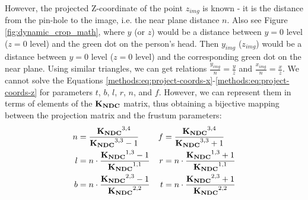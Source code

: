 However, the projected Z-coordinate of the point $z_{img}$ is known - it is the distance from the pin-hole to the image, i.e. the near plane distance $n$. Also see Figure \ref{fig:dynamic_crop_math}, where $y$ (or $z$) would be a distance between $y=0$ level ($z=0$ level) and the green dot on the person's head. Then $y_{img}$ ($z_{img}$) would be a distance between $y=0$ level ($z = 0$ level) and the corresponding green dot on the near plane. Using similar triangles, we can get relations $\tfrac{y_{img}}{n} = \tfrac{y}{z}$ and $\tfrac{x_{img}}{n} = \tfrac{x}{z}$. We cannot solve the Equations \ref{methods:eq:project-coords-x}-\ref{methods:eq:project-coords-z} for parameters $t$, $b$, $l$, $r$, $n$, and $f$. However, we can represent them in terms of elements of the $\bm{\mathrm{K_{NDC}}}$ matrix, thus obtaining a bijective mapping between the projection matrix and the frustum parameters:
\begin{align}
	n &= \dfrac{\bm{\mathrm{K_{NDC}}}^{3,4}}{\bm{\mathrm{K_{NDC}}}^{3,3} - 1} & f &= \dfrac{\bm{\mathrm{K_{NDC}}}^{3, 4}}{\bm{\mathrm{K_{NDC}}}^{3, 3} + 1} \\
	l &= n\cdot \dfrac{\bm{\mathrm{K_{NDC}}}^{1,3} - 1}{\bm{\mathrm{K_{NDC}}}^{1,1}} & r &= n\cdot \dfrac{\bm{\mathrm{K_{NDC}}}^{1,3} + 1}{\bm{\mathrm{K_{NDC}}}^{1,1}} \\
	b &= n\cdot \dfrac{\bm{\mathrm{K_{NDC}}}^{2,3} - 1}{\bm{\mathrm{K_{NDC}}}^{2,2}} & t &= n\cdot \dfrac{\bm{\mathrm{K_{NDC}}}^{2,3} + 1}{\bm{\mathrm{K_{NDC}}}^{2,2}} \label{methods:eq:frustum-from-matrix}
\end{align}

